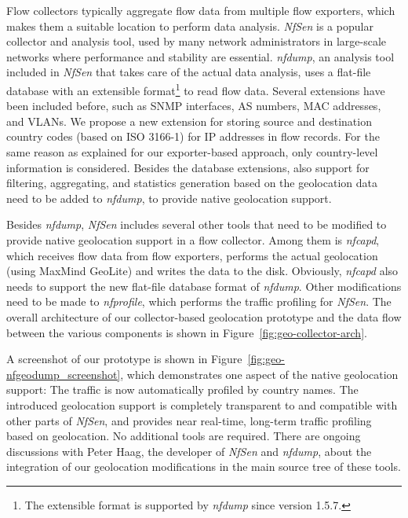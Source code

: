 Flow collectors typically aggregate flow data from multiple flow exporters, which makes them a suitable location to perform data analysis. \textit{NfSen} is a popular collector and analysis tool, used by many network administrators in large-scale networks where performance and stability are essential. \textit{nfdump}, an analysis tool included in \textit{NfSen} that takes care of the actual data analysis, uses a flat-file database with an extensible format\footnote{The extensible format is supported by \textit{nfdump} since version 1.5.7.} to read flow data. Several extensions have been included before, such as SNMP interfaces, AS numbers, MAC addresses, and VLANs. We propose a new extension for storing source and destination country codes (based on ISO 3166-1) for IP addresses in flow records. For the same reason as explained for our exporter-based approach, only country-level information is considered. Besides the database extensions, also support for filtering, aggregating, and statistics generation based on the geolocation data need to be added to \textit{nfdump}, to provide native geolocation support.

Besides \textit{nfdump}, \textit{NfSen} includes several other tools that need to be modified to provide native geolocation support in a flow collector. Among them is \textit{nfcapd}, which receives flow data from flow exporters, performs the actual geolocation (using MaxMind GeoLite) and writes the data to the disk. Obviously, \textit{nfcapd} also needs to support the new flat-file database format of \textit{nfdump}. Other modifications need to be made to \textit{nfprofile}, which performs the traffic profiling for \textit{NfSen}. The overall architecture of our collector-based geolocation prototype and the data flow between the various components is shown in Figure~\ref{fig:geo-collector-arch}.

A screenshot of our prototype is shown in Figure~\ref{fig:geo-nfgeodump_screenshot}, which demonstrates one aspect of the native geolocation support: The traffic is now automatically profiled by country names. The introduced geolocation support is completely transparent to and compatible with other parts of \textit{NfSen}, and provides near real-time, long-term traffic profiling based on geolocation. No additional tools are required. There are ongoing discussions with Peter Haag, the developer of \textit{NfSen} and \textit{nfdump}, about the integration of our geolocation modifications in the main source tree of these tools.

